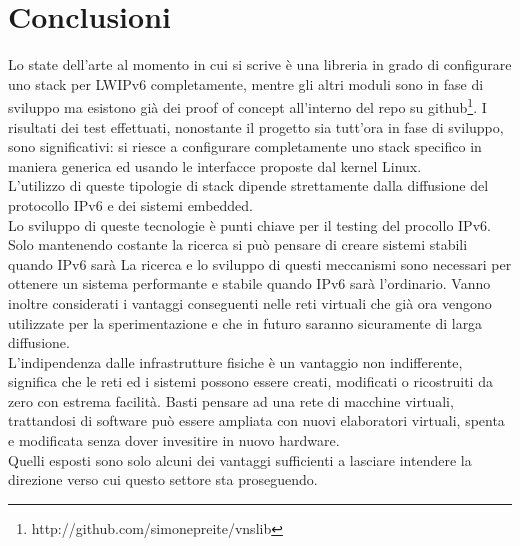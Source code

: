 
\chapter*{Conclusioni}
Lo state dell'arte al momento in cui si scrive \`e una libreria in grado di configurare uno stack per LWIPv6 completamente, mentre gli altri moduli sono in fase di sviluppo ma esistono gi\`a dei proof of concept all'interno del repo su github\footnote{http://github.com/simonepreite/vnslib}.
I risultati dei test effettuati, nonostante il progetto sia tutt'ora in fase di sviluppo, sono significativi: si riesce a configurare completamente uno stack specifico in maniera generica ed usando le interfacce proposte dal kernel Linux.\\
L'utilizzo di queste tipologie di stack dipende strettamente dalla diffusione del protocollo IPv6 e dei sistemi embedded.\\
Lo sviluppo di queste tecnologie \`e punti chiave per il testing del procollo IPv6. Solo mantenendo costante la ricerca si pu\`o pensare di creare sistemi stabili quando IPv6 sar\`a 
La ricerca e lo sviluppo di questi meccanismi sono necessari per ottenere un sistema performante e stabile quando IPv6 sar\`a l'ordinario. Vanno inoltre considerati i vantaggi conseguenti nelle reti virtuali che gi\`a ora vengono utilizzate per la sperimentazione e che in futuro saranno sicuramente di larga diffusione.\\
L'indipendenza dalle infrastrutture fisiche \`e un vantaggio non indifferente, significa che le reti ed i sistemi possono essere creati, modificati o ricostruiti da zero con estrema facilit\`a. Basti pensare ad una rete di macchine virtuali, trattandosi di software pu\`o essere ampliata con nuovi elaboratori virtuali, spenta e modificata senza dover invesitire in nuovo hardware.\\
Quelli esposti sono solo alcuni dei vantaggi sufficienti a lasciare intendere la direzione verso cui questo settore sta proseguendo.
